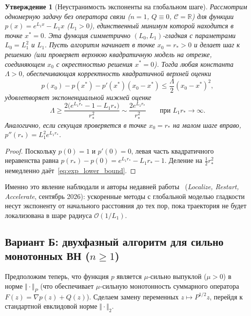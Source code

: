 \documentclass[11pt, a4paper]{article}
\newtheorem{proposition}{Утверждение}[section]
\theoremstyle{definition}
\begin{document}
\begin{proposition}[Неустранимость экспоненты на глобальном шаге]\label{prop:exp_barrier}
Рассмотрим одномерную задачу без оператора связи ($n = 1$, $Q \equiv 0$, $\mathcal{C} = \mathbb{R}$) для функции $p(x) = e^{L_1 x} - L_1 x$ ($L_1 > 0$), единственный минимум которой находится в точке $x^* = 0$. Эта функция симметрично $(L_0, L_1)$-гладкая с параметрами $L_0 = L_1^2$ и $L_1$. Пусть алгоритм начинает в точке $x_0 = r_* > 0$ и делает шаг к решению (или проверяет верхнюю квадратичную модель на отрезке, соединяющем $x_0$ с окрестностью решения $x^* = 0$). Тогда любая константа $\Lambda > 0$, обеспечивающая корректность квадратичной верхней оценки
\[
p(x_0) - p(x^*) - p'(x^*)(x_0 - x^*) \le \frac{\Lambda}{2}(x_0 - x^*)^2,
\]
удовлетворяет экспоненциальной нижней оценке
\begin{equation}\label{eq:exp_lower_bound}
\Lambda \ge \frac{2\big(e^{L_1 r_*} - 1 - L_1 r_*\big)}{r_*^2} \sim \frac{2 e^{L_1 r_*}}{r_*^2} \qquad \text{при } L_1 r_* \to \infty.
\end{equation}
Аналогично, если секущая проверяется в точке $x_0 = r_*$ на малом шаге вправо, $p''(r_*) = L_1^2 e^{L_1 r_*}$.
\end{proposition}

\begin{proof}
Поскольку $p(0) = 1$ и $p'(0) = 0$, левая часть квадратичного неравенства равна $p(r_*) - p(0) = e^{L_1 r_*} - L_1 r_* - 1$. Деление на $\frac{1}{2} r_*^2$ немедленно даёт~\eqref{eq:exp_lower_bound}.
\end{proof}

Именно это явление наблюдали и авторы недавней работы~\cite{Dvinskikh2026} (\emph{Localize, Restart, Accelerate}, сентябрь 2026): ускоренные методы с глобальной моделью гладкости несут экспоненту от начального расстояния до тех пор, пока траектория не будет локализована в шаре радиуса $\mathcal{O}(1/L_1)$.

\subsection{Вариант Б: двухфазный алгоритм для сильно монотонных ВН ($n \ge 1$)}

Предположим теперь, что функция $p$ является $\mu$-сильно выпуклой ($\mu > 0$) в норме $\Vert \cdot \Vert_P$ (что обеспечивает $\mu$-сильную монотонность суммарного оператора $F(z) = \nabla p(z) + Q(z)$). Сделаем замену переменных $z \mapsto P^{1/2} z$, перейдя к стандартной евклидовой норме $\Vert \cdot \Vert_2$.
\end{document}
